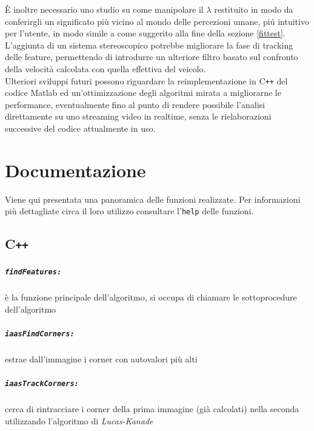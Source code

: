 \documentclass[12pt]{report}
\begin{document}
\noindent \`E inoltre necessario uno studio su come manipolare il $\lambda$ restituito in modo da conferirgli un significato pi\`u vicino al mondo delle percezioni umane, pi\'u intuitivo per l'utente, in modo simile a come suggerito alla fine della sezione \ref{fittest}.\\

\noindent L'aggiunta di un sistema stereoscopico potrebbe migliorare la fase di tracking delle feature, permettendo di introdurre un ulteriore filtro basato sul confronto della velocit\`a calcolata con quella effettiva del veicolo.\\

\noindent Ulteriori sviluppi futuri possono riguardare la reimplementazione in C\verb|++| del codice Matlab ed un'ottimizzazione degli algoritmi mirata a migliorarne le performance, eventualmente fino al punto di rendere possibile l'analisi direttamente su uno streaming video in realtime, senza le rielaborazioni successive del codice attualmente in uso.\\




\chapter{Documentazione}


Viene qui presentata una panoramica delle funzioni realizzate. Per informazioni pi\`u dettagliate circa il loro utilizzo consultare l'\verb|help| delle funzioni.

\section[C++]{C\verb_++_}

\paragraph*{\verb_findFeatures:_} \`e la funzione principale dell'algoritmo, si occupa di chiamare le sottoprocedure dell'algoritmo

\paragraph*{\verb_iaasFindCorners:_} estrae dall'immagine i corner con autovalori pi\`u alti

\paragraph*{\verb_iaasTrackCorners:_} cerca di rintracciare i corner della prima immagine (gi\`a calcolati) nella seconda utilizzando l'algoritmo di \emph{Lucas-Kanade}
\end{document}
